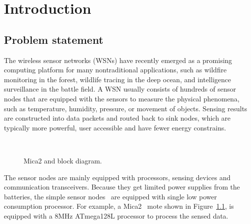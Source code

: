 \chapter{Introduction}\label{chap:intro}

\section{Problem statement}

The wireless sensor networks (WSNs) have recently emerged as a promising computing platform for many nontraditional applications, such as wildfire monitoring in the forest, wildlife tracing in the deep ocean, and intelligence surveillance in the battle field. A WSN usually consists of hundreds of sensor nodes that are equipped with the sensors to measure the physical phenomena, such as temperature, humidity, pressure, or movement of objects. Sensing results are constructed into data packets and routed back to sink nodes, which are typically more powerful, user accessible and have fewer energy constrains.

\begin{figure}[h]
\centering
\mbox{\quad
     \quad}
\caption{Mica2 and block diagram.}
\label{fig:mica2}
\end{figure}

The sensor nodes are mainly equipped with processors, sensing devices and communication transceivers. Because they get limited power supplies from the batteries, the simple sensor nodes~\cite{mica2-power, micaz-power,telos,telosb} are equipped with single low power consumption processor. 
For example, a Mica2~\cite{mica2-power} mote shown in Figure~\ref{fig:mica2}, is equipped with a 8MHz ATmega128L processor to process the sensed data.

